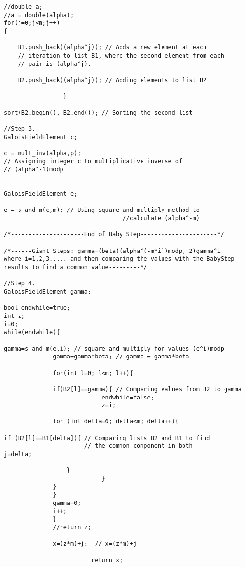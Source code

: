 \documentclass[iwp,first]{luthesis}
\begin{document}
\begin{verbatim}
//double a;
//a = double(alpha);
for(j=0;j<m;j++)
{				
			
    B1.push_back((alpha^j)); // Adds a new element at each
    // iteration to list B1, where the second element from each 
    // pair is (alpha^j). 

    B2.push_back((alpha^j)); // Adding elements to list B2
              
                 }

sort(B2.begin(), B2.end()); // Sorting the second list 

//Step 3.
GaloisFieldElement c;

c = mult_inv(alpha,p); 
// Assigning integer c to multiplicative inverse of 
// (alpha^-1)modp


GaloisFieldElement e;

e = s_and_m(c,m); // Using square and multiply method to 
				                  //calculate (alpha^-m)

/*---------------------End of Baby Step----------------------*/

/*------Giant Steps: gamma=(beta)(alpha^(-m*i))modp, 2)gamma^i 
where i=1,2,3..... and then comparing the values with the BabyStep 
results to find a common value---------*/ 

//Step 4.
GaloisFieldElement gamma;

bool endwhile=true; 
int z;
i=0;
while(endwhile){
              
gamma=s_and_m(e,i); // square and multiply for values (e^i)modp
              gamma=gamma*beta; // gamma = gamma*beta
              
              for(int l=0; l<m; l++){
                      
              if(B2[l]==gamma){ // Comparing values from B2 to gamma
                            endwhile=false; 
                            z=i; 
                            
              for (int delta=0; delta<m; delta++){
                  
if (B2[l]==B1[delta]){ // Comparing lists B2 and B1 to find 
                       // the common component in both
j=delta;

                  }
                            }
              }
              }
              gamma=0;
              i++;
              }
              //return z;
              
              x=(z*m)+j;  // x=(z*m)+j    
              
                         return x;
              

\end{verbatim}
\end{document}
